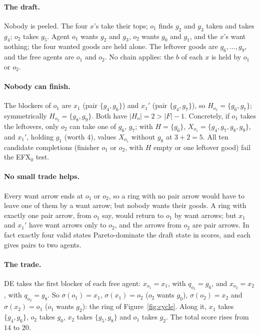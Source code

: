 \documentclass[runningheads,11pt]{llncs}
\newcommand{\efxz}{\texorpdfstring{\mbox{EFX$_0$}}{EFX0}}
\newcommand{\DE}{\textup{DE}}
\begin{document}
\paragraph{The draft.} Nobody is peeled. The four $x$'s take their tops; $o_1$ finds $g_2$ and $g_3$ taken and takes $g_4$; $o_2$ takes $g_5$. Agent $o_1$ wants $g_2$ and $g_3$, $o_2$ wants $g_0$ and $g_1$, and the $x$'s want nothing; the four wanted goods are held alone. The leftover goods are $g_6,\dots,g_9$, and the free agents are $o_1$ and $o_2$. No chain applies: the $b$ of each $x$ is held by $o_1$ or $o_2$.

\paragraph{Nobody can finish.} The blockers of $o_1$ are $x_1$ (pair $\{g_4,g_6\}$) and $x_1'$ (pair $\{g_4,g_7\}$), so $H_{o_1}=\{g_6,g_7\}$; symmetrically $H_{o_2}=\{g_8,g_9\}$. Both have $|H_o|=2>|F|-1$. Concretely, if $o_1$ takes the leftovers, only $o_2$ can take one of $g_6$, $g_7$; with $H=\{g_6\}$, $X_{o_1}=\{g_4,g_7,g_8,g_9\}$, and $x_1'$, holding $g_1$ (worth $4$), values $X_{o_1}$ without $g_8$ at $3+2=5$. All ten candidate completions (finisher $o_1$ or $o_2$, with $H$ empty or one leftover good) fail the \efxz{} test.

\paragraph{No small trade helps.} Every want arrow ends at $o_1$ or $o_2$, so a ring with no pair arrow would have to leave one of them by a want arrow; but nobody wants their goods. A ring with exactly one pair arrow, from $o_1$ say, would return to $o_1$ by want arrows; but $x_1$ and $x_1'$ have want arrows only to $o_2$, and the arrows from $o_2$ are pair arrows. In fact exactly four valid states Pareto-dominate the draft state in scores, and each gives pairs to two agents.

\paragraph{The trade.} \DE{} takes the first blocker of each free agent: $x_{o_1}=x_1$, with $q_{o_1}=g_6$, and $x_{o_2}=x_2$, with $q_{o_2}=g_8$. So $\sigma(o_1)=x_1$, $\sigma(x_1)=o_2$ ($o_2$ wants $g_0$), $\sigma(o_2)=x_2$ and $\sigma(x_2)=o_1$ ($o_1$ wants $g_2$): the ring of Figure~\ref{fig:cycle}. Along it, $x_1$ takes $\{g_4,g_6\}$, $o_2$ takes $g_0$, $x_2$ takes $\{g_5,g_8\}$ and $o_1$ takes $g_2$. The total score rises from $14$ to $20$.
\end{document}

